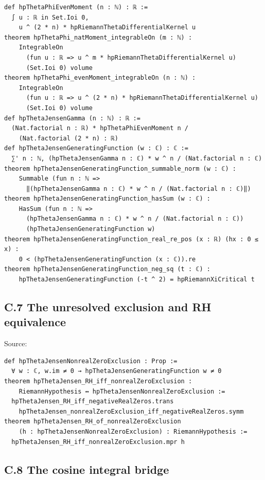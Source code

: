 \documentclass[
  11pt,
]{article}
\begin{document}
\begin{verbatim}
def hpThetaPhiEvenMoment (n : ℕ) : ℝ :=
  ∫ u : ℝ in Set.Ioi 0,
    u ^ (2 * n) * hpRiemannThetaDifferentialKernel u
theorem hpThetaPhi_natMoment_integrableOn (m : ℕ) :
    IntegrableOn
      (fun u : ℝ => u ^ m * hpRiemannThetaDifferentialKernel u)
      (Set.Ioi 0) volume
theorem hpThetaPhi_evenMoment_integrableOn (n : ℕ) :
    IntegrableOn
      (fun u : ℝ => u ^ (2 * n) * hpRiemannThetaDifferentialKernel u)
      (Set.Ioi 0) volume
def hpThetaJensenGamma (n : ℕ) : ℝ :=
  (Nat.factorial n : ℝ) * hpThetaPhiEvenMoment n /
    (Nat.factorial (2 * n) : ℝ)
def hpThetaJensenGeneratingFunction (w : ℂ) : ℂ :=
  ∑' n : ℕ, (hpThetaJensenGamma n : ℂ) * w ^ n / (Nat.factorial n : ℂ)
theorem hpThetaJensenGeneratingFunction_summable_norm (w : ℂ) :
    Summable (fun n : ℕ =>
      ‖(hpThetaJensenGamma n : ℂ) * w ^ n / (Nat.factorial n : ℂ)‖)
theorem hpThetaJensenGeneratingFunction_hasSum (w : ℂ) :
    HasSum (fun n : ℕ =>
      (hpThetaJensenGamma n : ℂ) * w ^ n / (Nat.factorial n : ℂ))
      (hpThetaJensenGeneratingFunction w)
theorem hpThetaJensenGeneratingFunction_real_re_pos (x : ℝ) (hx : 0 ≤ x) :
    0 < (hpThetaJensenGeneratingFunction (x : ℂ)).re
theorem hpThetaJensenGeneratingFunction_neg_sq (t : ℂ) :
    hpThetaJensenGeneratingFunction (-t ^ 2) = hpRiemannXiCritical t
\end{verbatim}

\hypertarget{c.7-the-unresolved-exclusion-and-rh-equivalence}{%
\subsection{C.7 The unresolved exclusion and RH equivalence}\label{c.7-the-unresolved-exclusion-and-rh-equivalence}}

Source: 

\begin{verbatim}
def hpThetaJensenNonrealZeroExclusion : Prop :=
  ∀ w : ℂ, w.im ≠ 0 → hpThetaJensenGeneratingFunction w ≠ 0
theorem hpThetaJensen_RH_iff_nonrealZeroExclusion :
    RiemannHypothesis ↔ hpThetaJensenNonrealZeroExclusion :=
  hpThetaJensen_RH_iff_negativeRealZeros.trans
    hpThetaJensen_nonrealZeroExclusion_iff_negativeRealZeros.symm
theorem hpThetaJensen_RH_of_nonrealZeroExclusion
    (h : hpThetaJensenNonrealZeroExclusion) : RiemannHypothesis :=
  hpThetaJensen_RH_iff_nonrealZeroExclusion.mpr h
\end{verbatim}

\hypertarget{c.8-the-cosine-integral-bridge}{%
\subsection{C.8 The cosine integral bridge}\label{c.8-the-cosine-integral-bridge}}
\end{document}
